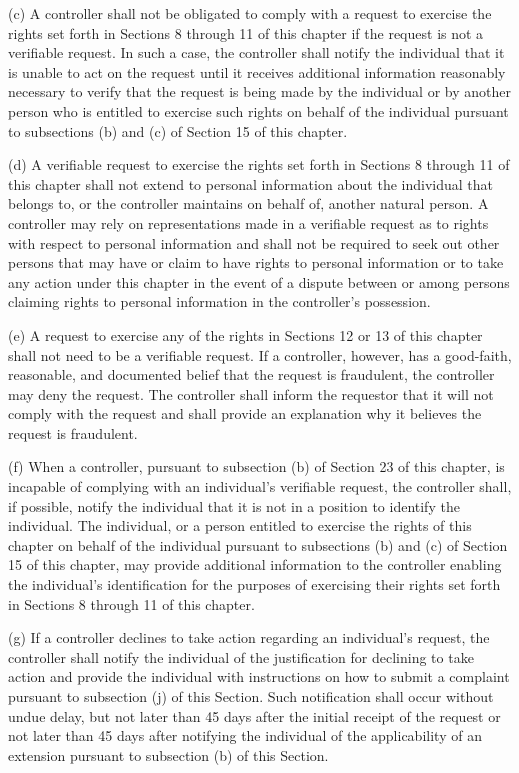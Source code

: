 (c) A controller shall not be obligated to comply with a request to exercise the rights set forth in Sections 8 through 11 of this chapter if the request is not a verifiable request. In such a case, the controller shall notify the individual that it is unable to act on the request until it receives additional information reasonably necessary to verify that the request is being made by the individual or by another person who is entitled to exercise such rights on behalf of the individual pursuant to subsections (b) and (c) of Section 15 of this chapter.

(d) A verifiable request to exercise the rights set forth in Sections 8 through 11 of this chapter shall not extend to personal information about the individual that belongs to, or the controller maintains on behalf of, another natural person. A controller may rely on representations made in a verifiable request as to rights with respect to personal information and shall not be required to seek out other persons that may have or claim to have rights to personal information or to take any action under this chapter in the event of a dispute between or among persons claiming rights to personal information in the controller’s possession. 

(e) A request to exercise any of the rights in Sections 12 or 13 of this chapter shall not need to be a verifiable request. If a controller, however, has a good-faith, reasonable, and documented belief that the request is fraudulent, the controller may deny the request. The controller shall inform the requestor that it will not comply with the request and shall provide an explanation why it believes the request is fraudulent.

(f) When a controller, pursuant to subsection (b) of Section 23 of this chapter, is incapable of complying with an individual’s verifiable request, the controller shall, if possible, notify the individual that it is not in a position to identify the individual. The individual, or a person entitled to exercise the rights of this chapter on behalf of the individual pursuant to subsections (b) and (c) of Section 15 of this chapter, may provide additional information to the controller enabling the individual’s identification for the purposes of exercising their rights set forth in Sections 8 through 11 of this chapter. 

(g) If a controller declines to take action regarding an individual’s request, the controller shall notify the individual of the justification for declining to take action and provide the individual with instructions on how to submit a complaint pursuant to subsection (j) of this Section. Such notification shall occur without undue delay, but not later than 45 days after the initial receipt of the request or not later than 45 days after notifying the individual of the applicability of an extension pursuant to subsection (b) of this Section.  

